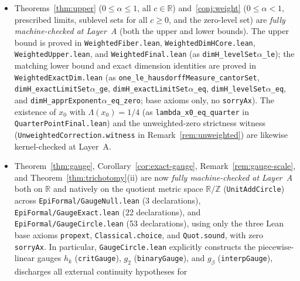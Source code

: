 \documentclass[11pt]{article}
\theoremstyle{definition}
\theoremstyle{remark}
\newcommand{\R}{\mathbb{R}}
\newcommand{\Z}{\mathbb{Z}}
\newcommand{\dimH}{\dim_{\mathrm{H}}}
\newcommand{\Lam}{\Lambda}
\begin{document}
\begin{itemize}[leftmargin=1.5em]
$\dimH\{\Lam=\infty\}=1$---are likewise kernel-checked at Layer~A in
\texttt{EpiFormal/\allowbreak{}GaugeExact.lean}
(\texttt{volume\_finiteLevel\_zero}, \texttt{ae\_apprExponent\_eq\_top},
\texttt{volume\_infiniteLevel\_Icc}, and
\texttt{dimH\_infiniteLevel\_eq\_one}).
\item Theorems~\ref{thm:upper} ($0\le\alpha\le1$, all $c\in\R$)
and~\ref{conj:weight} ($0\le\alpha<1$, prescribed limits, sublevel sets for all
$c\ge0$, and the zero-level set) are \emph{fully machine-checked at Layer~A}
(both the upper and lower bounds). The upper bound is proved in
\texttt{Weighted\allowbreak Fiber.lean}, \texttt{Weighted\allowbreak DimHCore.lean},
\texttt{Weighted\allowbreak Upper.lean}, and \texttt{Weighted\allowbreak Final.lean}
(as \texttt{dimH\_\allowbreak levelSet\ensuremath{\alpha}\_le}); the
matching lower bound and exact dimension identities are proved in
\texttt{Weighted\allowbreak ExactDim.lean}
(as \texttt{one\_\allowbreak le\_\allowbreak hausdorff\allowbreak Measure\_\allowbreak cantorSet},
\texttt{dimH\_\allowbreak exact\allowbreak LimitSet\ensuremath{\alpha}\_ge},
\texttt{dimH\_\allowbreak exact\allowbreak LimitSet\ensuremath{\alpha}\_eq},
\texttt{dimH\_\allowbreak levelSet\ensuremath{\alpha}\_eq}, and
\texttt{dimH\_\allowbreak appr\allowbreak Exponent\ensuremath{\alpha}\_eq\_\allowbreak zero}; base
axioms only, no \texttt{sorryAx}). The existence of $x_0$ with $\Lam(x_0)=1/4$
(as \texttt{lambda\_\allowbreak x0\_\allowbreak eq\_\allowbreak quarter} in \texttt{Quarter\allowbreak Point\allowbreak Final.lean}) and the
unweighted-zero strictness witness
(\texttt{Unweighted\allowbreak Correction.\allowbreak witness} in Remark~\ref{rem:unweighted})
are likewise kernel-checked at Layer~A.
\item Theorem~\ref{thm:gauge}, Corollary~\ref{cor:exact-gauge},
Remark~\ref{rem:gauge-scale}, and Theorem~\ref{thm:trichotomy}(ii) are now
\emph{fully machine-checked at Layer~A} both on $\R$ and natively on the
quotient metric space $\R/\Z$ (\texttt{UnitAddCircle}) across
\texttt{EpiFormal/\allowbreak GaugeNull.lean} (3 declarations),
\texttt{EpiFormal/\allowbreak GaugeExact.lean} (22 declarations), and
\texttt{EpiFormal/\allowbreak GaugeCircle.lean} (53 declarations), using only
the three Lean base axioms \texttt{propext}, \texttt{Classical.choice}, and
\texttt{Quot.sound}, with zero \texttt{sorryAx}. In particular,
\texttt{GaugeCircle.lean} explicitly constructs the piecewise-linear gauges
$h_k$ (\texttt{critGauge}), $g_2$ (\texttt{binaryGauge}), and $g_\beta$
(\texttt{interpGauge}), discharges all external continuity hypotheses for

\end{itemize}
\end{document}
